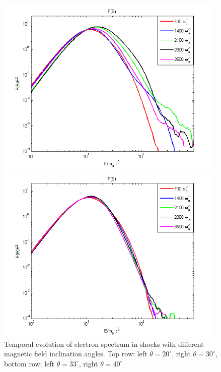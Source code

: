 \documentclass[a4paper]{jpconf}
\begin{document}
\begin{figure}[h!]
\begin{minipage}{0.47\textwidth}
			\includegraphics[width=0.98\textwidth]{fig/spectrum33.png} 
		\end{minipage}
		\begin{minipage}{0.47\textwidth}
			\centering
			\includegraphics[width=0.98\textwidth]{fig/spectrum40.png} 
		\end{minipage}
		\caption{Temporal evolution of electron spectrum in shocks with different magnetic field inclination angles. Top row: left $\theta = 20^\circ$, right $\theta = 30^\circ$, bottom row: left $\theta = 33^\circ$, right $\theta = 40^\circ$}
		\label{spectrume}
	\end{figure}
\end{document}

